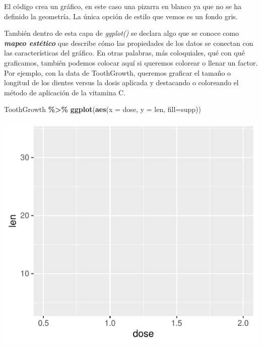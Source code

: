 \documentclass[
]{book}
\newenvironment{Shaded}{\begin{snugshade}}{\end{snugshade}}
\newcommand{\AttributeTok}[1]{\textcolor[rgb]{0.13,0.29,0.53}{#1}}
\newcommand{\FunctionTok}[1]{\textcolor[rgb]{0.13,0.29,0.53}{\textbf{#1}}}
\newcommand{\NormalTok}[1]{#1}
\newcommand{\SpecialCharTok}[1]{\textcolor[rgb]{0.81,0.36,0.00}{\textbf{#1}}}
\begin{document}
El código crea un gráfico, en este caso una pizarra en blanco ya que no se ha definido la geometría.
La única opción de estilo que vemos es un fondo gris.

También dentro de esta capa de \emph{ggplot()} se declara algo que se conoce como \textbf{\emph{mapeo estético}} que describe cómo las propiedades de los datos se conectan con las características del gráfico.
En otras palabras, más coloquiales, qué con qué graficamos, también podemos colocar aquí si queremos colorear o llenar un factor.
Por ejemplo, con la data de ToothGrowth, queremos graficar el tamaño o longitud de los dientes versus la dosis aplicada y destacando o coloreando el método de aplicación de la vitamina C.\\

\begin{Shaded}
\begin{Highlighting}[]
\NormalTok{ToothGrowth }\SpecialCharTok{\%\textgreater{}\%} \FunctionTok{ggplot}\NormalTok{(}\FunctionTok{aes}\NormalTok{(}\AttributeTok{x =}\NormalTok{ dose, }\AttributeTok{y =}\NormalTok{ len, }\AttributeTok{fill=}\NormalTok{supp))}
\end{Highlighting}
\end{Shaded}

\begin{center}\includegraphics{R_Manual_files/figure-latex/unnamed-chunk-205-1} \end{center}
\end{document}
